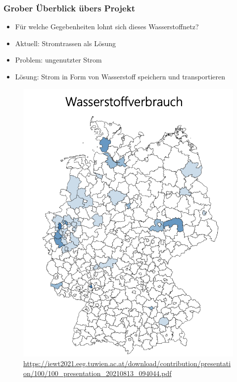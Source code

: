 \documentclass[aspectratio=169,t]{beamer}
\begin{document}
	\begin{frame}
		\frametitle{Grober Überblick übers Projekt}
		\vspace*{-4mm}
		\begin{minipage}{1\linewidth}
			\begin{minipage}{.5\linewidth}
				\vspace*{-12mm}
				
				\begin{itemize}
					
					\item Für welche Gegebenheiten lohnt sich dieses Wasserstoffnetz?
						\vspace*{2mm}
					
					\item Aktuell: Stromtrassen als Lösung
						\vspace*{2mm}
					
					\item Problem: ungenutzter Strom 
						\vspace*{2mm}
					
					\item Lösung: Strom in Form von Wasserstoff speichern und transportieren 
					
					
				\end{itemize}
			\end{minipage}
			\hfill
			\begin{minipage}{.5\linewidth}
				\centering
				\vspace*{-0.55cm}
				\begin{figure}
					\includegraphics[width=.7\linewidth]{h2.png}
				\vspace*{-0.25cm}
				\caption[]{\small\url{https://iewt2021.eeg.tuwien.ac.at/download/contribution/presentation/100/100_presentation_20210813_094044.pdf}}
				\end{figure}
			\end{minipage}
		\end{minipage}
		

\end{frame}
\end{document}
